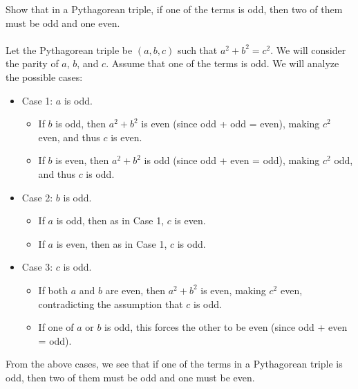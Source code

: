 \documentclass[12pt]{exam}
\begin{document}
\begin{questions}
\newpage 
\question 
Show that in a Pythagorean triple, if one of the terms is odd, then two of them must be odd and one even. 
\\\\
Let the Pythagorean triple be $(a,b,c)$ such that $a^2 + b^2 = c^2$. We will consider the parity of $a$, $b$, and $c$. Assume that one of the terms is odd. We will analyze the possible cases:
\begin{itemize}
  \item Case 1: $a$ is odd.
    \begin{itemize}
      \item If $b$ is odd, then $a^2 + b^2$ is even (since odd + odd = even), making $c^2$ even, and thus $c$ is even.
      \item If $b$ is even, then $a^2 + b^2$ is odd (since odd + even = odd), making $c^2$ odd, and thus $c$ is odd.
    \end{itemize}
  \item Case 2: $b$ is odd.
    \begin{itemize}
      \item If $a$ is odd, then as in Case 1, $c$ is even.
      \item If $a$ is even, then as in Case 1, $c$ is odd.
    \end{itemize}
  \item Case 3: $c$ is odd.
    \begin{itemize}
      \item If both $a$ and $b$ are even, then $a^2 + b^2$ is even, making $c^2$ even, contradicting the assumption that $c$ is odd.
      \item If one of $a$ or $b$ is odd, this forces the other to be even (since odd + even = odd).
    \end{itemize}
\end{itemize}
From the above cases, we see that if one of the terms in a Pythagorean triple is odd, then two of them must be odd and one must be even.

\end{questions}
\end{document}
